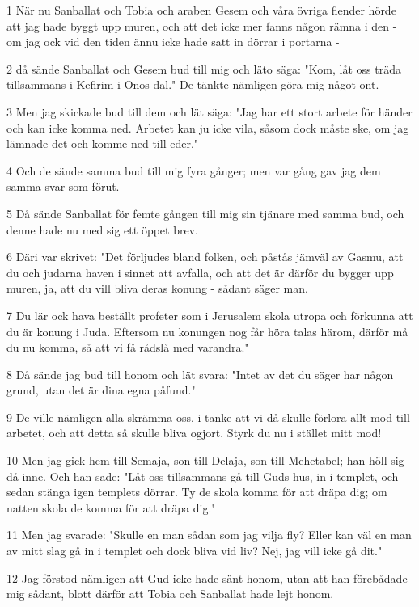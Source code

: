 \par 1 När nu Sanballat och Tobia och araben Gesem och våra övriga fiender hörde att jag hade byggt upp muren, och att det icke mer fanns någon rämna i den - om jag ock vid den tiden ännu icke hade satt in dörrar i portarna -
\par 2 då sände Sanballat och Gesem bud till mig och läto säga: "Kom, låt oss träda tillsammans i Kefirim i Onos dal." De tänkte nämligen göra mig något ont.
\par 3 Men jag skickade bud till dem och lät säga: "Jag har ett stort arbete för händer och kan icke komma ned. Arbetet kan ju icke vila, såsom dock måste ske, om jag lämnade det och komme ned till eder."
\par 4 Och de sände samma bud till mig fyra gånger; men var gång gav jag dem samma svar som förut.
\par 5 Då sände Sanballat för femte gången till mig sin tjänare med samma bud, och denne hade nu med sig ett öppet brev.
\par 6 Däri var skrivet: "Det förljudes bland folken, och påstås jämväl av Gasmu, att du och judarna haven i sinnet att avfalla, och att det är därför du bygger upp muren, ja, att du vill bliva deras konung - sådant säger man.
\par 7 Du lär ock hava beställt profeter som i Jerusalem skola utropa och förkunna att du är konung i Juda. Eftersom nu konungen nog får höra talas härom, därför må du nu komma, så att vi få rådslå med varandra."
\par 8 Då sände jag bud till honom och lät svara: "Intet av det du säger har någon grund, utan det är dina egna påfund."
\par 9 De ville nämligen alla skrämma oss, i tanke att vi då skulle förlora allt mod till arbetet, och att detta så skulle bliva ogjort. Styrk du nu i stället mitt mod!
\par 10 Men jag gick hem till Semaja, son till Delaja, son till Mehetabel; han höll sig då inne. Och han sade: "Låt oss tillsammans gå till Guds hus, in i templet, och sedan stänga igen templets dörrar. Ty de skola komma för att dräpa dig; om natten skola de komma för att dräpa dig."
\par 11 Men jag svarade: "Skulle en man sådan som jag vilja fly? Eller kan väl en man av mitt slag gå in i templet och dock bliva vid liv? Nej, jag vill icke gå dit."
\par 12 Jag förstod nämligen att Gud icke hade sänt honom, utan att han förebådade mig sådant, blott därför att Tobia och Sanballat hade lejt honom.
